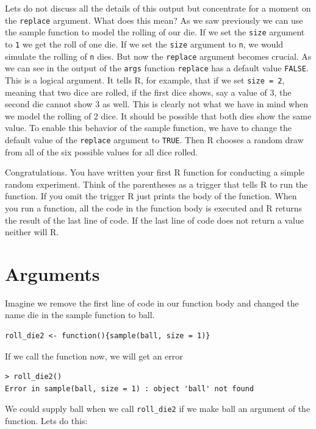 \documentclass[
]{book}
\begin{document}
Lets do not discuss all the details of this output but concentrate for a moment on the \texttt{replace}
argument. What does this mean? As we saw previously we can use the sample function to
model the rolling of our die. If we set the \texttt{size} argument to \texttt{1} we get the roll of one
die. If we set the \texttt{size} argument to \texttt{n}, we would simulate the rolling of \texttt{n} dies.
But now the \texttt{replace} argument becomes crucial. As we can see in the output of the
\texttt{args} function \texttt{replace} has a default value \texttt{FALSE}. This is a logical argument.
It tells R, for example, that if we set \texttt{size\ =\ 2}, meaning that two dice are rolled, if the
first dice shows, say a value of 3, the second die cannot show 3 as well. This is clearly not
what we have in mind when we model the rolling of 2 dice. It should be possible that
both dies show the same value. To enable this behavior of the sample function, we have to
change the default value of the \texttt{replace} argument to \texttt{TRUE}. Then R chooses a random draw
from all of the six possible values for all dice rolled.

Congratulations. You have written your first R function for conducting a simple random
experiment. Think of the parentheses as a trigger that tells R to run the function. If
you omit the trigger R just prints the body of the function. When you run a function,
all the code in the function body is executed and R returns the result of the last
line of code. If the last line of code does not return a value neither will R.

\hypertarget{arguments}{%
\section{Arguments}\label{arguments}}

Imagine we remove the first line of code in our function body and changed the name
die in the sample function to ball.

\begin{verbatim}
roll_die2 <- function(){sample(ball, size = 1)}
\end{verbatim}

If we call the function now, we will get an error

\begin{verbatim}
> roll_die2()
Error in sample(ball, size = 1) : object 'ball' not found
\end{verbatim}

We could supply ball when we call \texttt{roll\_die2} if we make ball an argument of the
function. Lets do this:
\end{document}
